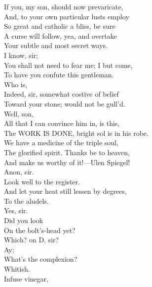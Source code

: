 \documentclass[a4paper,oneside]{memoir}
\begin{document}
\begin{drama*}
If you, my son, should now prevaricate,\\
And, to your own particular lusts employ\\
So great and catholic a bliss, be sure\\
A curse will follow, yea, and overtake\\
Your subtle and most secret ways.\\
\mammonspeaks {} I know, sir;\\
You shall not need to fear me; I but come,\\
To have you confute this gentleman.\\
\surlyspeaks {} Who is,\\
Indeed, sir, somewhat costive of belief\\
Toward your stone; would not be gull'd.\\
\subtlespeaks {} Well, son,\\
All that I can convince him in, is this,\\
The WORK IS DONE, bright sol is in his robe.\\
We have a medicine of the triple soul,\\
The glorified spirit. Thanks be to heaven,\\
And make us worthy of it!---Ulen Spiegel!\\
\facespeaks {} Anon, sir.\\
\subtlespeaks {} Look well to the register.\\
And let your heat still lessen by degrees,\\
To the aludels.\\
\facespeaks {}  Yes, sir.\\
\subtlespeaks {} Did you look\\
On the bolt's-head yet?\\
\facespeaks {}  Which? on D, sir?\\
\subtlespeaks {} Ay;\\
What's the complexion?\\
\facespeaks {}  Whitish.\\
\subtlespeaks {} Infuse vinegar,\\

\end{drama*}
\end{document}
